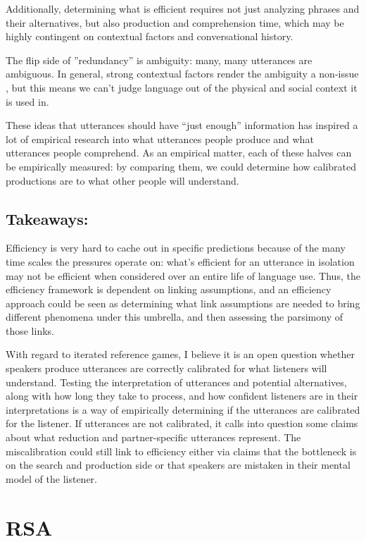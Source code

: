 \documentclass[]{article}
\begin{document}
Additionally, determining what is efficient requires not just analyzing phrases and their alternatives, but also production and comprehension time, which may be highly contingent on contextual factors and conversational history. 

The flip side of ''redundancy'' is ambiguity: many, many utterances are ambiguous. In general, strong contextual factors render the ambiguity a non-issue \cite{piantadosi2012}, but this means we can't judge language out of the physical and social context it is used in. 

These ideas that utterances should have ``just enough'' information has inspired a lot of empirical research into what utterances people produce and what utterances people comprehend. As an empirical matter, each of these halves can be empirically measured: by comparing them, we could determine how calibrated productions are to what other people will understand. 



\subsection{Takeaways:}
Efficiency is very hard to cache out in specific predictions because of the many time scales the pressures operate on: what's efficient for an utterance in isolation may not be efficient when considered over an entire life of language use. Thus, the efficiency framework is dependent on linking assumptions, and an efficiency approach could be seen as determining what link assumptions are needed to bring different phenomena under this umbrella, and then assessing the parsimony of those links.

With regard to iterated reference games, I believe it is an open question whether speakers produce utterances are correctly calibrated for what listeners will understand. Testing the interpretation of utterances and potential alternatives, along with how long they take to process, and how confident listeners are in their interpretations is a way of empirically determining if the utterances are calibrated for the listener. If utterances are not calibrated, it calls into question some claims about what reduction and partner-specific utterances represent. The miscalibration could still link to efficiency either via claims that the bottleneck is on the search and production side or that speakers are mistaken in their mental model of the listener. 


\section{RSA}
\end{document}
